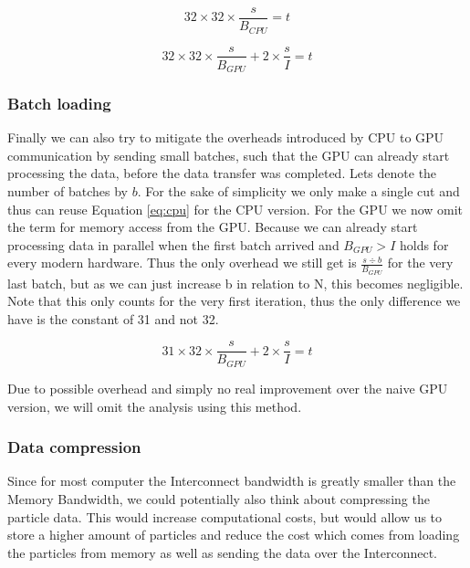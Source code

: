 \documentclass[]{article}
\begin{document}
\begin{center}
	\begin{equation}
		32 \times 32 \times \frac{s}{B_{CPU}} = t
		\label{eq:cputree}
	\end{equation}
\end{center}

\begin{center}
	\begin{equation}
		32 \times 32 \times \frac{s}{B_{GPU}} + 2 \times \frac{s}{I} = t
		\label{eq:gputree}
	\end{equation}
\end{center}


\subsubsection{Batch loading}

Finally we can also try to mitigate the overheads introduced by CPU to GPU communication by sending small batches, such that the GPU can already start processing the data, before the data transfer was completed. Lets denote the number of batches by $b$. For the sake of simplicity we only make a single cut and thus can reuse Equation \ref{eq:cpu} for the CPU version. For the GPU we now omit the term for memory access from the GPU. Because we can already start processing data in parallel when the first batch arrived and $B_{GPU} > I$ holds for every modern hardware. Thus the only overhead we still get is $\frac{s \div b}{B_{GPU}}$ for the very last batch, but as we can just increase b in relation to N, this becomes negligible. Note that this only counts for the very first iteration, thus the only difference we have is the constant of 31 and not 32. 

\begin{center}
	\begin{equation}
		31 \times 32 \times \frac{s}{B_{GPU}} + 2 \times \frac{s}{I} = t
		\label{eq:gpubatch}
	\end{equation}
\end{center}

Due to possible overhead and simply no real improvement over the naive GPU version, we will omit the analysis using this method.

\subsubsection{Data compression}

Since for most computer the Interconnect bandwidth is greatly smaller than the Memory Bandwidth, we could potentially also think about compressing the particle data. This would increase computational costs, but would allow us to store a higher amount of particles and reduce the cost which comes from loading the particles from memory as well as sending the data over the Interconnect.
\end{document}
